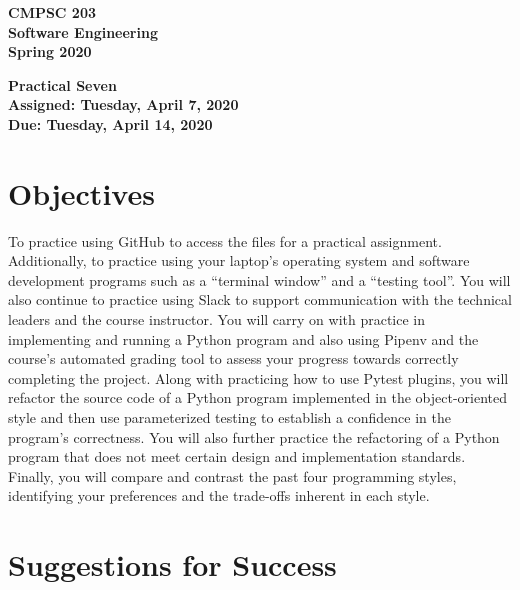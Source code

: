 \documentclass[11pt]{article}
\newcommand{\assignmentduedate}{April 14}
\newcommand{\assignmentassignedate}{April 7}
\newcommand{\assignmentnumber}{Seven}
\newcommand{\labyear}{2020}
\newcommand{\labdueday}{Tuesday}
\newcommand{\labassignday}{Tuesday}
\newcommand{\assigneddate}{Assigned: \labassignday, \assignmentassignedate, \labyear{}}
\newcommand{\duedate}{Due: \labdueday, \assignmentduedate, \labyear{}}
\newcommand{\labtitle}[1]
{
  \begin{center}
    \begin{center}
      \bf
      CMPSC 203\\Software Engineering\\
      Spring 2020\\
      \medskip
    \end{center}
    \bf
    #1
  \end{center}
}
\begin{document}
\thispagestyle{empty}

\labtitle{Practical \assignmentnumber{} \\ \assigneddate{} \\ \duedate{}}

\section*{Objectives}

To practice using GitHub to access the files for a practical assignment.
Additionally, to practice using your laptop's operating system and software
development programs such as a ``terminal window'' and a ``testing tool''. You
will also continue to practice using Slack to support communication with the
technical leaders and the course instructor. You will carry on with practice
in implementing and running a Python program and also using Pipenv and the
course's automated grading tool to assess your progress towards correctly
completing the project. Along with practicing how to use Pytest plugins, you
will refactor the source code of a Python program implemented in the
object-oriented style and then use parameterized testing to establish a
confidence in the program's correctness. You will also further practice the
refactoring of a Python program that does not meet certain design and
implementation standards. Finally, you will compare and contrast the past four
programming styles, identifying your preferences and the trade-offs inherent in
each style.

\section*{Suggestions for Success}
\end{document}
